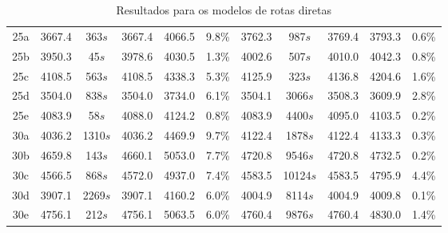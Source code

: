\documentclass[12pt]{article}
\begin{document}
\begin{table}[!htb]
\begin{tabular}{|c|c|c|c|c|c||c|c|c|c|c|}
\hline \hline
25a & 3667.4 & 363$s$ & 3667.4 & 4066.5 & 9.8\% & 3762.3 & 987$s$ & 3769.4 & 3793.3 & 0.6\% \\
25b & 3950.3 & 45$s$ & 3978.6 & 4030.5 & 1.3\% & 4002.6 & 507$s$ & 4010.0 & 4042.3 & 0.8\% \\
25c & 4108.5 & 563$s$ & 4108.5 & 4338.3 & 5.3\% & 4125.9 & 323$s$ & 4136.8 & 4204.6 & 1.6\% \\
25d & 3504.0 & 838$s$ & 3504.0 & 3734.0 & 6.1\% & 3504.1 & 3066$s$ & 3508.3 & 3609.9 & 2.8\% \\
25e & 4083.9 & 58$s$ & 4088.0 & 4124.2 & 0.8\% & 4083.9 & 4400$s$ & 4095.0 & 4103.5 & 0.2\% \\
\hline \hline
30a & 4036.2 & 1310$s$ & 4036.2 & 4469.9 & 9.7\% & 4122.4 & 1878$s$ & 4122.4 & 4133.3 & 0.3\%\\
30b & 4659.8 & 143$s$ & 4660.1 & 5053.0 & 7.7\% & 4720.8 & 9546$s$ & 4720.8 & 4732.5 & 0.2\% \\
30c & 4566.5 & 868$s$ & 4572.0 & 4937.0 & 7.4\% & 4583.5 & 10124$s$ & 4583.5 & 4795.9 & 4.4\% \\
30d & 3907.1 & 2269$s$ & 3907.1 & 4160.2 & 6.0\% & 4004.9 & 8114$s$ & 4004.9 & 4009.8 & 0.1\% \\
30e & 4756.1 & 212$s$ & 4756.1 & 5063.5 & 6.0\% & 4760.4 & 9876$s$ & 4760.4 & 4830.0 & 1.4\%\\
\hline
\end{tabular}
\caption{Resultados para os modelos de rotas diretas}
\end{table}
\end{document}
